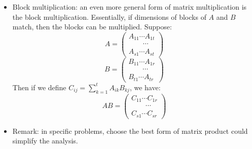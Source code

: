 \documentclass{report}
\begin{document}
\begin{itemize}
\item Block multiplication: an even more general form of matrix multiplication is the block multiplication. Essentially, if dimensions of blocks of $A$ and $B$ match, then the blocks can be multiplied. Suppose: 
\begin{equation}
A = \left(
\begin{array}{l}
A_{11} \cdots A_{1t}\\
\qquad \cdots \\
A_{s1} \cdots A_{st}
\end{array}
\right)	
\end{equation}
\begin{equation}
B = \left(
\begin{array}{l}
B_{11} \cdots A_{1r}\\
\qquad \cdots \\
B_{t1} \cdots A_{tr}
\end{array}
\right)	
\end{equation}
Then if we define $C_{ij} = \sum_{k=1}^t A_{ik} B_{kj}$, we have: 
\begin{equation}
AB = \left(
\begin{array}{l}
C_{11} \cdots C_{1r}\\
\qquad \cdots \\
C_{s1} \cdots C_{sr}
\end{array}
\right)	
\end{equation}

\item Remark: in specific problems, choose the best form of matrix product could simplify the analysis. 
\end{itemize}
\end{document}
